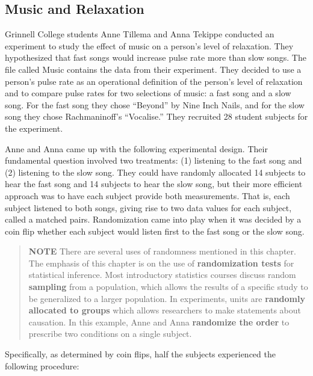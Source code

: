 \documentclass[
]{book}
\begin{document}
\hypertarget{music-and-relaxation}{%
\subsection*{Music and Relaxation}\label{music-and-relaxation}}

Grinnell College students Anne Tillema and Anna Tekippe conducted an experiment to study the effect of music on a person's level of relaxation. They hypothesized that fast songs would increase pulse rate more than slow songs. The file called Music contains the data from their experiment. They decided to use a person's pulse rate as an operational definition of the person's level of relaxation and to compare pulse rates for two selections of music: a fast song and a slow song. For the fast song they chose ``Beyond'' by Nine Inch Nails, and for the slow song they chose Rachmaninoff's ``Vocalise.'' They recruited 28 student subjects for the experiment.

Anne and Anna came up with the following experimental design. Their fundamental question
involved two treatments: (1) listening to the fast song and (2) listening to the slow song. They could have randomly allocated 14 subjects to hear the fast song and 14 subjects to hear the slow song, but their more efficient approach was to have each subject provide both measurements. That is, each subject listened to both songs, giving rise to two data values for each subject, called a matched pairs. Randomization came into play when it was decided by a coin flip whether each subject would listen first to the fast song or the slow song.

\begin{quote}
\textbf{NOTE} There are several uses of randomness mentioned in this chapter. The emphasis of this chapter is on the use of \textbf{randomization tests} for statistical inference. Most introductory statistics courses discuss random \textbf{sampling} from a population, which allows the results of a specific study to be generalized to a larger
population. In experiments, units are \textbf{randomly allocated to groups} which allows researchers to make statements about causation. In this example, Anne and Anna \textbf{randomize the order} to prescribe two conditions on a single subject.
\end{quote}

Specifically, as determined by coin flips, half the subjects experienced the following procedure:
\end{document}
